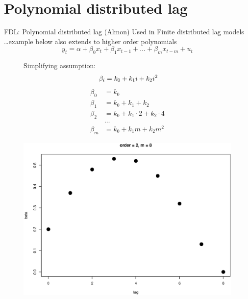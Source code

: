 \documentclass{beamer}
\begin{document}
\section{Polynomial distributed lag}
\begin{frame}{FDL: Polynomial distributed lag (Almon)}
Used in Finite distributed lag models\\
\dots example below also extends to higher order polynomials
\begin{equation} \label{Almon1}
y_t = \alpha + \beta_0 x_t + \beta_1 x_{t-1} + \dots + \beta_m x_{t-m} + u_t 
\end{equation}
\begin{figure}[!htb]
    \centering
    \begin{minipage}{.48\textwidth}
    Simplifying assumption:
\begin{equation} \label{eqpol2}
~\beta_i = k_0 + k_1 i  + k_2  i^2  \\ 
\end{equation}
\hline 
\small{
\begin{equation*}
\begin{aligned}
\beta_0 & = k_0  \\
\beta_1 & = k_0 + k_1 + k_2 \\
\beta_2 & = k_0 + k_1\!\cdot\!2 + k_2\!\cdot\!4 \\
& \ldots \\ 
\beta_m & = k_0 +  k_1 m +  k_2 m^2 
\end{aligned}
\end{equation*}
}%
\end{minipage}
\begin{minipage}{0.509\textwidth}
\includegraphics[width=\textwidth]{img/Polynom_2.eps}
\end{minipage}
\end{figure}
\end{frame}
\end{document}
